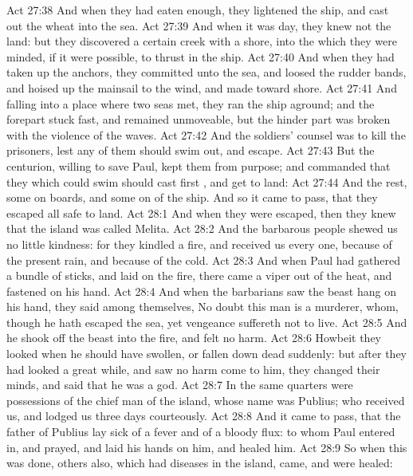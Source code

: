 \vs Act 27:38 And when they had eaten enough, they lightened the ship, and cast out the wheat into the sea.
\vs Act 27:39 And when it was day, they knew not the land: but they discovered a certain creek with a shore, into the which they were minded, if it were possible, to thrust in the ship.
\vs Act 27:40 And when they had taken up the anchors, they committed  unto the sea, and loosed the rudder bands, and hoised up the mainsail to the wind, and made toward shore.
\vs Act 27:41 And falling into a place where two seas met, they ran the ship aground; and the forepart stuck fast, and remained unmoveable, but the hinder part was broken with the violence of the waves.
\vs Act 27:42 And the soldiers' counsel was to kill the prisoners, lest any of them should swim out, and escape.
\vs Act 27:43 But the centurion, willing to save Paul, kept them from  purpose; and commanded that they which could swim should cast  first , and get to land:
\vs Act 27:44 And the rest, some on boards, and some on  of the ship. And so it came to pass, that they escaped all safe to land.
\vs Act 28:1 And when they were escaped, then they knew that the island was called Melita.
\vs Act 28:2 And the barbarous people shewed us no little kindness: for they kindled a fire, and received us every one, because of the present rain, and because of the cold.
\vs Act 28:3 And when Paul had gathered a bundle of sticks, and laid  on the fire, there came a viper out of the heat, and fastened on his hand.
\vs Act 28:4 And when the barbarians saw the  beast hang on his hand, they said among themselves, No doubt this man is a murderer, whom, though he hath escaped the sea, yet vengeance suffereth not to live.
\vs Act 28:5 And he shook off the beast into the fire, and felt no harm.
\vs Act 28:6 Howbeit they looked when he should have swollen, or fallen down dead suddenly: but after they had looked a great while, and saw no harm come to him, they changed their minds, and said that he was a god.
\vs Act 28:7 In the same quarters were possessions of the chief man of the island, whose name was Publius; who received us, and lodged us three days courteously.
\vs Act 28:8 And it came to pass, that the father of Publius lay sick of a fever and of a bloody flux: to whom Paul entered in, and prayed, and laid his hands on him, and healed him.
\vs Act 28:9 So when this was done, others also, which had diseases in the island, came, and were healed:
